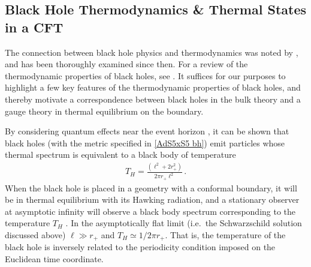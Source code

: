 \documentclass[../PhD.tex]{subfiles}
\begin{document}

\subsection{Black Hole Thermodynamics \& Thermal States in a CFT}
\label{sub: bh thermo}

The connection between black hole physics and thermodynamics was noted by \cite{Bekenstein:1973ur}, and has been thoroughly examined since then. For a review of the thermodynamic properties of black holes, see \cite{Jacobson1996, Bardeen:1973gs, Hawking:1982dh, 1803.03633}. It suffices for our purposes to highlight a few key features of the thermodynamic properties of black holes, and thereby motivate a correspondence between black holes in the bulk theory and a gauge theory in thermal equilibrium on the boundary.

By considering quantum effects near the event horizon \cite{Hawking:1974rv}, it can be shown that black holes (with the metric specified in \eqref{AdS5xS5 bh}) emit particles whose thermal spectrum is equivalent to a black body of temperature \cite{Hawking:1974sw}
\begin{align}
\label{hawking temp}
T_H = \frac{(\ell^2 + 2r_+^2)}{2 \pi r_+ \ell^2} \, .
\end{align}
When the black hole is placed in a geometry with a conformal boundary, it will be in thermal equilibrium with its Hawking radiation, and a stationary observer at asymptotic infinity will observe a black body spectrum corresponding to the temperature $T_H$ \cite{Carroll:2004st}. In the asymptotically flat limit (i.e.~the Schwarzschild solution discussed above) $\ell \gg r_+$ and $T_H \simeq 1/2\pi r_+$. That is, the temperature of the black hole is inversely related to the periodicity condition imposed on the Euclidean time coordinate.
\end{document}
